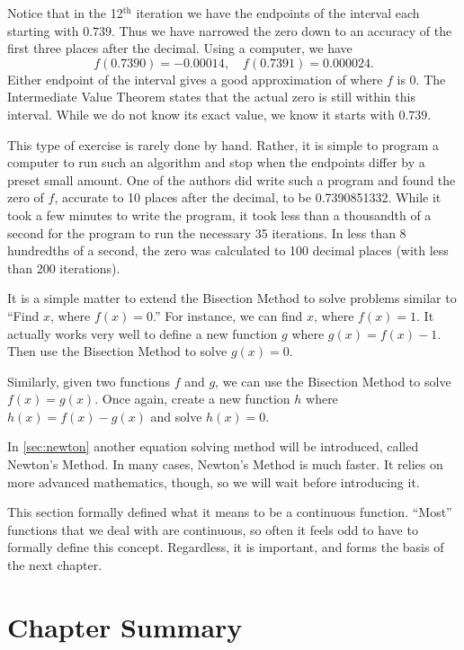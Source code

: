 \begin{example}
Notice that in the 12$^\text{th}$ iteration we have the endpoints of the interval each starting with $0.739$. Thus we have narrowed the zero down to an accuracy of the first three places after the decimal. Using a computer, we have 
\[ f(0.7390) = -0.00014, \quad f(0.7391) = 0.000024.\]
Either endpoint of the interval gives a good approximation of where $f$ is 0. The Intermediate Value Theorem states that the actual zero is still within this interval. While we do not know its exact value, we know it starts with $0.739$. 

This type of exercise is rarely done by hand. Rather, it is simple to program a computer to run such an algorithm and stop when the endpoints differ by a preset small amount. One of the authors did write such a program and found the zero of $f$, accurate to 10 places after the decimal, to be 0.7390851332. While it took a few minutes to write the program, it took less than a thousandth of a second for the program to run the necessary 35 iterations. In less than 8 hundredths of a second, the zero was calculated to 100 decimal places (with less than 200 iterations).
\end{example}

It is a simple matter to extend the Bisection Method to solve problems similar to ``Find $x$, where $f(x) = 0$.'' For instance, we can find $x$, where $f(x) = 1$. %
It actually works very well to define a new function $g$ where $g(x) = f(x) - 1$. Then use the Bisection Method to solve $g(x)=0$.  

Similarly, given two functions $f$ and $g$, we can use the Bisection Method to solve $f(x) = g(x)$. Once again, create a new function $h$ where $h(x) = f(x)-g(x)$ and solve $h(x) = 0$. 

In \autoref{sec:newton} another equation solving method will be introduced, called Newton's Method. In many cases, Newton's Method is much faster. It relies on more advanced mathematics, though, so we will wait before introducing it. 

This section formally defined what it means to be a continuous function. ``Most'' functions that we deal with are continuous, so often it feels odd to have to formally define this concept. Regardless, it is important, and forms the basis of the next chapter.

\section*{Chapter Summary}

